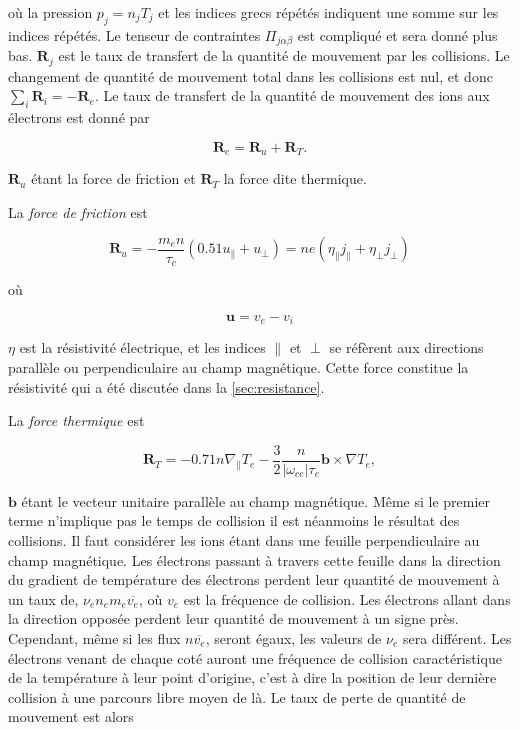 \documentclass[main.tex]{subfiles}
\begin{document}
\nit où la pression \( p_j = n_j T_j \) et les indices grecs répétés indiquent une somme sur les indices répétés.
Le tenseur de contraintes \( \Pi_{j\alpha \beta} \) est compliqué et sera donné plus bas. \( \bm{R}_j \) est le taux de transfert de la quantité de mouvement par les collisions.
Le changement de quantité de mouvement total dans les collisions est nul, et donc \( \sum_i \bm{R}_i = - \bm{R}_e \).
Le taux de transfert de la quantité de mouvement des ions aux électrons est donné par

\[
	\bm{R}_e = \bm{R}_u + \bm{R}_T.
\]

\( \bm{R}_u \) étant la force de friction et \( \bm{R}_T \) la force dite thermique.

La \textit{force de friction} est

\[
	\bm{R}_u = - \frac{m_e n}{\tau_c} \left( 0.51 u_\parallel + u_\perp \right) = ne \left( \eta_\parallel j_\parallel + \eta_\perp j_\perp \right)
\]

\nit où

\[
	\bm{u} = v_e - v_i
\]

\nit \( \eta \) est la résistivité électrique, et les indices \( \parallel \) et \( \perp \) se réfèrent aux directions parallèle ou perpendiculaire au champ magnétique.
Cette force constitue la résistivité qui a été discutée dans la \autoref{sec:resistance}.

La \textit{force thermique} est

\begin{equation}
	\bm{R}_T = -0.71n \nabla_\parallel T_e - \frac{3}{2} \frac{n}{\left\vert \omega_{ce}\right\vert \tau_e} \bm{b} \times \nabla T_e,
	\label{eq:brag_force_thermique}
\end{equation}

\nit \( \bm{b} \) étant le vecteur unitaire parallèle au champ magnétique.
Même si le premier terme n'implique pas le temps de collision il est néanmoins le résultat des collisions.
Il faut considérer les ions étant dans une feuille perpendiculaire au champ magnétique.
Les électrons passant à travers cette feuille dans la direction du gradient de température des électrons perdent leur quantité de mouvement à un taux de, \( \nu_e n_e m_e \overline{v_e} \), où \( v_e \) est la fréquence de collision. Les électrons allant dans la direction opposée perdent leur quantité de mouvement à un signe près.
Cependant, même si les flux \( n \overline{v_e} \), seront égaux, les valeurs de \( \nu_e \) sera différent.
Les électrons venant de chaque coté auront une fréquence de collision caractéristique de la température à leur point d'origine,  c'est à dire la position de leur dernière collision à une parcours libre moyen de là.
Le taux de perte de quantité de mouvement est alors
\end{document}
